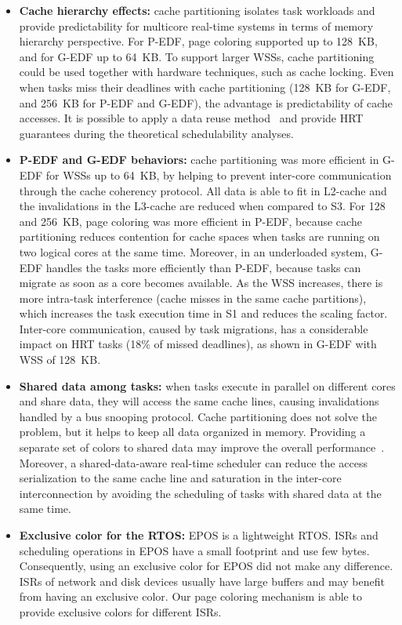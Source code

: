 \documentclass[10pt, conference, compsocconf]{IEEEtran}
\begin{document}
\begin{itemize}
	\item \textbf{Cache hierarchy effects:} cache partitioning isolates task workloads and provide predictability for multicore real-time systems in terms of memory hierarchy perspective. For P-EDF, page coloring supported up to 128~KB, and for G-EDF up to 64~KB. To support larger WSSs, cache partitioning could be used together with hardware techniques, such as cache locking. Even when tasks miss their deadlines with cache partitioning (128~KB for G-EDF, and 256~KB for P-EDF and G-EDF), the advantage is predictability of cache accesses. It is possible to apply a data reuse method~\cite{Jiang:2010} and provide HRT guarantees during the theoretical schedulability analyses.

	\item \textbf{P-EDF and G-EDF behaviors:} cache partitioning was more efficient in G-EDF for WSSs up to 64~KB, by helping to prevent inter-core communication through the cache coherency protocol. All data is able to fit in L2-cache and the invalidations in the L3-cache are reduced when compared to S3. For 128 and 256~KB, page coloring was more efficient in P-EDF, because cache partitioning reduces contention for cache spaces when tasks are running on two logical cores at the same time. Moreover, in an underloaded system, G-EDF handles the tasks more efficiently than P-EDF, because tasks can migrate as soon as a core becomes available. As the WSS increases, there is more intra-task interference (cache misses in the same cache partitions), which increases the task execution time in S1 and reduces the scaling factor. Inter-core communication, caused by task migrations, has a considerable impact on HRT tasks (18\% of missed deadlines), as shown in G-EDF with WSS of 128~KB.
	
	\item \textbf{Shared data among tasks:} when tasks execute in parallel on different cores and share data, they will access the same cache lines, causing invalidations handled by a bus snooping protocol. Cache partitioning does not solve the problem, but it helps to keep all data organized in memory. Providing a separate set of colors to shared data may improve the overall performance~\cite{Chen:2009}. Moreover, a shared-data-aware real-time scheduler can reduce the access serialization to the same cache line and saturation in the inter-core interconnection by avoiding the scheduling of tasks with shared data at the same time.
	
	\item \textbf{Exclusive color for the RTOS:} EPOS is a lightweight RTOS. ISRs and scheduling operations in EPOS have a small footprint and use few bytes. Consequently, using an exclusive color for EPOS did not make any difference. ISRs of network and disk devices usually have large buffers and may benefit from having an exclusive color. Our page coloring mechanism is able to provide exclusive colors for different ISRs.
	

\end{itemize}
\end{document}

